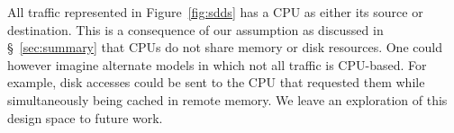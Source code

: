 All traffic represented in Figure~\ref{fig:sdds} has a CPU as either its source or destination. This is a consequence of our assumption as discussed in \S~\ref{sec:summary} that CPUs do not share memory or disk resources. One could however imagine alternate models in which not all traffic is CPU-based. For example, disk accesses could be sent to the CPU that requested them while simultaneously being cached in remote memory. We leave an exploration of this design space to future work.


